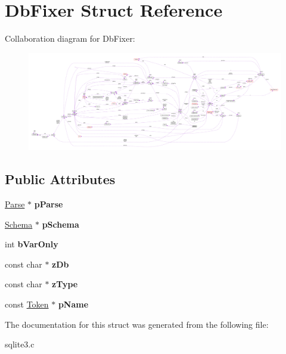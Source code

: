 \hypertarget{structDbFixer}{}\section{Db\+Fixer Struct Reference}
\label{structDbFixer}


Collaboration diagram for Db\+Fixer\+:\nopagebreak
\begin{figure}[H]
\begin{center}
\leavevmode
\includegraphics[width=350pt]{structDbFixer__coll__graph}
\end{center}
\end{figure}
\subsection*{Public Attributes}
\begin{DoxyCompactItemize}
\item 
\hyperlink{structParse}{Parse} $\ast$ {\bfseries p\+Parse}\hypertarget{structDbFixer_ac5c9b8bca3b05a66faea11dd998bf6f6}{}\label{structDbFixer_ac5c9b8bca3b05a66faea11dd998bf6f6}

\item 
\hyperlink{structSchema}{Schema} $\ast$ {\bfseries p\+Schema}\hypertarget{structDbFixer_a302dd5335c8a982deda5bf04bae00363}{}\label{structDbFixer_a302dd5335c8a982deda5bf04bae00363}

\item 
int {\bfseries b\+Var\+Only}\hypertarget{structDbFixer_aebd8549176b84c8c71069ed4d77ad6af}{}\label{structDbFixer_aebd8549176b84c8c71069ed4d77ad6af}

\item 
const char $\ast$ {\bfseries z\+Db}\hypertarget{structDbFixer_aba91df5965a99915d9180805d02c4a7f}{}\label{structDbFixer_aba91df5965a99915d9180805d02c4a7f}

\item 
const char $\ast$ {\bfseries z\+Type}\hypertarget{structDbFixer_ae4748d9e97560b7b332527434408c2e8}{}\label{structDbFixer_ae4748d9e97560b7b332527434408c2e8}

\item 
const \hyperlink{structToken}{Token} $\ast$ {\bfseries p\+Name}\hypertarget{structDbFixer_aedee20e10de7337651b84656ee81b39c}{}\label{structDbFixer_aedee20e10de7337651b84656ee81b39c}

\end{DoxyCompactItemize}


The documentation for this struct was generated from the following file\+:\begin{DoxyCompactItemize}
\item 
sqlite3.\+c\end{DoxyCompactItemize}
